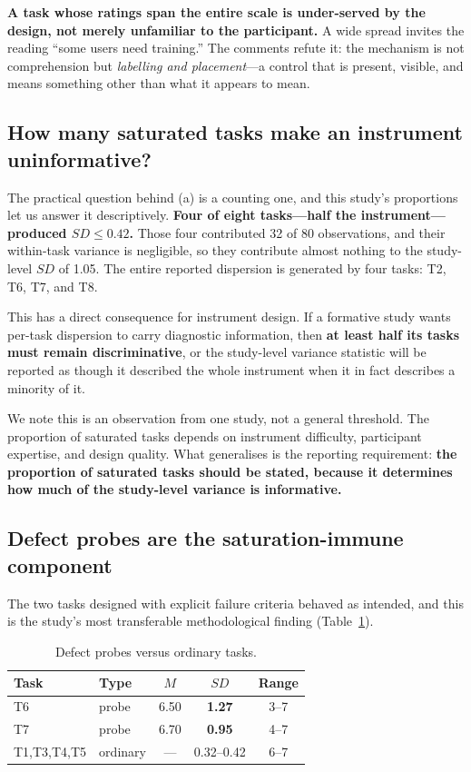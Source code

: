 \documentclass[conference]{IEEEtran}
\begin{document}
\textbf{A task whose ratings span the entire scale is under-served by the
design, not merely unfamiliar to the participant.} A wide spread invites the
reading ``some users need training.'' The comments refute it: the mechanism is
not comprehension but \emph{labelling and placement}---a control that is
present, visible, and means something other than what it appears to mean.

\subsection{How many saturated tasks make an instrument uninformative?}

The practical question behind (a) is a counting one, and this study's
proportions let us answer it descriptively. \textbf{Four of eight tasks---half
the instrument---produced $SD\leq0.42$.} Those four contributed 32 of 80
observations, and their within-task variance is negligible, so they contribute
almost nothing to the study-level $SD$ of 1.05. The entire reported dispersion
is generated by four tasks: T2, T6, T7, and T8.

This has a direct consequence for instrument design. If a formative study wants
per-task dispersion to carry diagnostic information, then \textbf{at least half
its tasks must remain discriminative}, or the study-level variance statistic
will be reported as though it described the whole instrument when it in fact
describes a minority of it.

We note this is an observation from one study, not a general threshold. The
proportion of saturated tasks depends on instrument difficulty, participant
expertise, and design quality. What generalises is the reporting requirement:
\textbf{the proportion of saturated tasks should be stated, because it
determines how much of the study-level variance is informative.}

\subsection{Defect probes are the saturation-immune component}

The two tasks designed with explicit failure criteria behaved as intended, and
this is the study's most transferable methodological finding
(Table~\ref{tab:probes}).

\begin{table}[t]
\caption{Defect probes versus ordinary tasks.}
\label{tab:probes}
\centering
\begin{tabular}{@{}llccc@{}}
\toprule
Task & Type & $M$ & $SD$ & Range \\
\midrule
T6 & probe      & 6.50 & \textbf{1.27} & 3--7 \\
T7 & probe      & 6.70 & \textbf{0.95} & 4--7 \\
T1,T3,T4,T5 & ordinary & --- & 0.32--0.42 & 6--7 \\
\bottomrule
\end{tabular}
\end{table}
\end{document}
